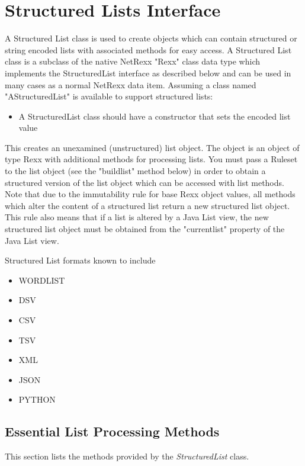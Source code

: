 \chapter{Structured Lists Interface}\label{reflists}
 
A Structured List class is used to create objects which can contain
structured or string encoded lists with associated methods for easy
access. A Structured List class is a subclass of the native NetRexx
"Rexx" class data type which implements the StructuredList interface
as described below and can be used in many cases as a normal NetRexx
data item. Assuming a class named "AStructuredList" is available to
support structured lists:

\begin{itemize}
\item A StructuredList class should have a constructor that sets the
  encoded list value
\end{itemize}
 
This creates an unexamined (unstructured) list object. The object is
an object of type Rexx with additional methods for processing lists. You
must pass a Ruleset to the list object (see the "buildlist" method
below) in order to obtain a structured version of the list object
which can be accessed with list methods. Note that due to the
immutability rule for base Rexx object values, all methods which alter
the content of a structured list return a new structured list
object. This rule also means that if a list is altered by a Java List
view, the new structured list object must be obtained from the
"currentlist" property of the Java List view. 

Structured List formats
known to \nr{} include 
\begin{itemize}
\item WORDLIST
\item DSV
\item CSV
\item TSV
\item XML
\item JSON
\item PYTHON
\end{itemize}

\section{Essential List Processing Methods}
This section lists the methods provided by the \emph{StructuredList}
class.

